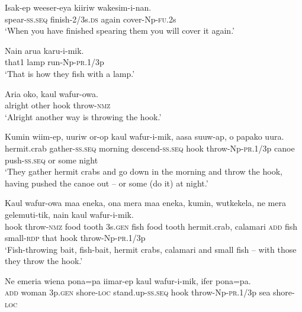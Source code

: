 \ea
\gll  Isak-ep  weeser-eya  kiiriw  wakesim-i-nan. \\
spear-\textsc{ss.seq}  finish-2/3s.\textsc{ds}  again  cover-Np-\textsc{fu}.2s \\
\glt ‘When you have finished spearing them you will cover it again.’ \\
\z


\ea
\gll  Nain  arua  karu-i-mik. \\
that1  lamp  run-Np-\textsc{pr}.1/3p \\
\glt ‘That is how they fish with a lamp.’ \\
\z


\ea
\gll  Aria  oko,  kaul  wafur-owa. \\
alright  other  hook  throw-\textsc{nmz} \\
\glt ‘Alright another way is throwing the hook.’ \\
\z


\ea
\gll  Kumin  wiim-ep,  uuriw  or-op  kaul                   wafur-i-mik,  aasa  suuw-ap,  o  papako  uura. \\
hermit.crab  gather-\textsc{ss.seq}  morning  descend-\textsc{ss.seq}  hook   throw-Np-\textsc{pr}.1/3p  canoe  push-\textsc{ss.seq}  or  some  night \\


\glt ‘They gather hermit crabs and go down in the morning and throw the hook, having pushed the canoe out – or some (do it) at night.’ \\
\z


\ea
\gll  Kaul  wafur-owa  maa  eneka,  ona  mera  maa  eneka,   kumin,  wutkekela,  ne  mera  gelemuti-tik,        nain  kaul  wafur-i-mik. \\
hook  throw-\textsc{nmz}  food  tooth  3s.\textsc{gen}  fish  food  tooth      hermit.crab,  calamari  \textsc{add}  fish  small-\textsc{rdp}       that  hook  throw-Np-\textsc{pr}.1/3p \\




\glt ‘Fish-throwing bait, fish-bait, hermit crabs, calamari and small fish – with those they throw the hook.’ \\
\z


\ea
\gll  Ne  emeria  wiena  pona=pa  iimar-ep       kaul  wafur-i-mik,  ifer  pona=pa. \\
\textsc{add}  woman  3p.\textsc{gen}  shore-\textsc{loc}  stand.up-\textsc{ss.seq}   hook  throw-Np-\textsc{pr}.1/3p  sea  shore-\textsc{loc} \\


